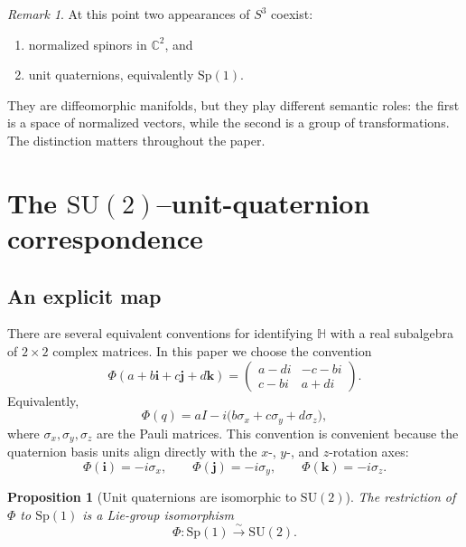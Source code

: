 \documentclass[11pt]{article}
\newtheorem{proposition}[definition]{Proposition}
\theoremstyle{remark}
\newtheorem{remark}[definition]{Remark}
\newcommand{\C}{\mathbb{C}}
\newcommand{\HH}{\mathbb{H}}
\newcommand{\SU}{\mathrm{SU}}
\newcommand{\Sp}{\mathrm{Sp}}
\newcommand{\ii}{\mathbf{i}}
\newcommand{\jj}{\mathbf{j}}
\newcommand{\kk}{\mathbf{k}}
\newcommand{\Id}{I}
\begin{document}
\begin{remark}
At this point two appearances of $S^3$ coexist:
\begin{enumerate}[label=(\roman*)]
\item normalized spinors in $\C^2$, and
\item unit quaternions, equivalently $\Sp(1)$.
\end{enumerate}
They are diffeomorphic manifolds, but they play different semantic roles: the first is a space of normalized vectors, while the second is a group of transformations. The distinction matters throughout the paper.
\end{remark}

\section{The \texorpdfstring{$\SU(2)$}{SU(2)}--unit-quaternion correspondence}

\subsection{An explicit map}

There are several equivalent conventions for identifying $\HH$ with a real subalgebra of $2\times2$ complex matrices. In this paper we choose the convention
\begin{equation}
\Phi(a+b\ii+c\jj+d\kk)
=
\begin{pmatrix}
a-di & -c-bi\\
c-bi & a+di
\end{pmatrix}.
\label{eq:phi}
\end{equation}
Equivalently,
\[
\Phi(q)=a\Id-i\bigl(b\sigma_x+c\sigma_y+d\sigma_z\bigr),
\]
where $\sigma_x,\sigma_y,\sigma_z$ are the Pauli matrices. This convention is convenient because the quaternion basis units align directly with the $x$-, $y$-, and $z$-rotation axes:
\[
\Phi(\ii)=-i\sigma_x,\qquad \Phi(\jj)=-i\sigma_y,\qquad \Phi(\kk)=-i\sigma_z.
\]

\begin{proposition}[Unit quaternions are isomorphic to $\SU(2)$]
The restriction of $\Phi$ to $\Sp(1)$ is a Lie-group isomorphism
\[
\Phi:\Sp(1)\xrightarrow{\sim}\SU(2).
\]
\end{proposition}
\end{document}
